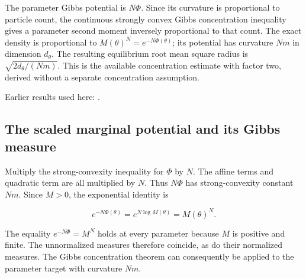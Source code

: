 \documentclass[11pt,a4paper]{report}
\begin{document}
The parameter Gibbs potential is \(N\Phi\). Since its curvature is proportional to particle count, the continuous strongly convex Gibbs concentration inequality gives a parameter second moment inversely proportional to that count. The exact density is proportional to \(M(\theta)^N=e^{-N\Phi(\theta)}\); its potential has curvature \(Nm\) in dimension \(d_\theta\). The resulting equilibrium root mean square radius is \(\sqrt{2d_\theta/(Nm)}\). This is the available concentration estimate with factor two, derived without a separate concentration assumption.



Earlier results used here: \cite[Section~3.49]{LangevinLean2026ULASC}.
\subsection{\texorpdfstring{The scaled marginal potential and its Gibbs measure}{The scaled marginal potential and its Gibbs measure}}
\label{report-step-IPLA-Concentration-lean-1}


Multiply the strong-convexity inequality for \(\Phi\) by \(N\). The affine terms and quadratic term are all multiplied by \(N\). Thus \(N\Phi\) has strong-convexity constant \(Nm\). Since \(M>0\), the exponential identity is

\[e^{-N\Phi(\theta)}=e^{N\log M(\theta)}=M(\theta)^N.\]

The equality \(e^{-N\Phi}=M^N\) holds at every parameter because \(M\) is positive and finite. The unnormalized measures therefore coincide, as do their normalized measures. The Gibbs concentration theorem can consequently be applied to the parameter target with curvature \(Nm\).
\end{document}
